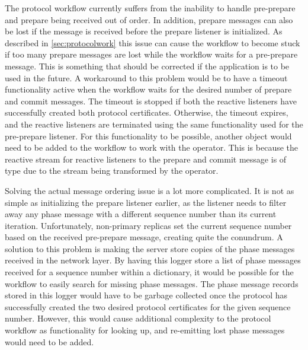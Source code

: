 The protocol workflow currently suffers from the inability to handle pre-prepare and prepare being received out of order. In addition, prepare messages can also be lost if the message is received before the prepare listener is initialized. As described in \autoref{sec:protocolwork} this issue can cause the workflow to become stuck if too many prepare messages are lost while the workflow waits for a pre-prepare message. This is something that should be corrected if the application is to be used in the future. A workaround to this problem would be to have a timeout functionality active when the workflow waits for the desired number of prepare and commit messages. The timeout is stopped if both the reactive listeners have successfully created both protocol certificates. Otherwise, the timeout expires, and the reactive listeners are terminated using the same functionality used for the pre-prepare listener. For this functionality to be possible, another  object would need to be added to the workflow to work with the  operator. This is because the reactive stream for reactive listeners to the prepare and commit message is of type  due to the stream being transformed by the  operator.

Solving the actual message ordering issue is a lot more complicated. It is not as simple as initializing the prepare listener earlier, as the listener needs to filter away any phase message with a different sequence number than its current iteration. Unfortunately, non-primary replicas set the current sequence number based on the received pre-prepare message, creating quite the conundrum. A solution to this problem is making the server store copies of the phase messages received in the network layer. By having this logger store a list of phase messages received for a sequence number within a dictionary, it would be possible for the workflow to easily search for missing phase messages. The phase message records stored in this logger would have to be garbage collected once the protocol has successfully created the two desired protocol certificates for the given sequence number. However, this would cause additional complexity to the protocol workflow as functionality for looking up, and re-emitting lost phase messages would need to be added.

